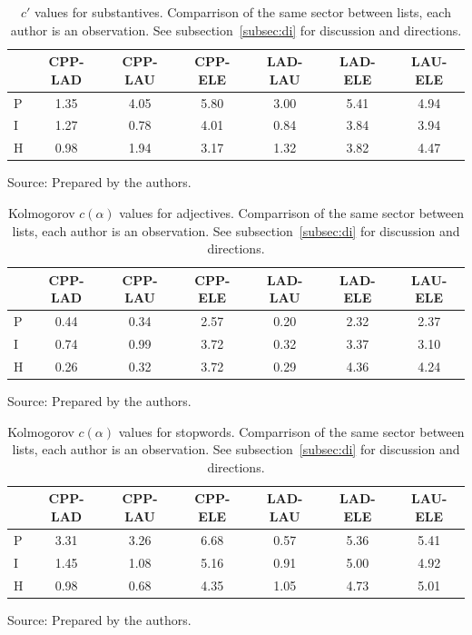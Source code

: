 \begin{table}
  \centering
  \caption{$c'$ values for substantives. Comparrison of the same sector between lists, each author is an observation. See subsection~\ref{subsec:di} for discussion and directions.}
    \small
\setlength{\tabcolsep}{.06667em}
  \begin{tabular}{|l|| c|c|c|c|c|c|}\hline
& CPP-LAD & CPP-LAU & CPP-ELE & LAD-LAU & LAD-ELE & LAU-ELE \\\hline
P & 1.35 & 4.05 & 5.80 & 3.00 & 5.41 & 4.94 \\\hline
I & 1.27 & 0.78 & 4.01 & 0.84 & 3.84 & 3.94 \\\hline
H & 0.98 & 1.94 & 3.17 & 1.32 & 3.82 & 4.47 \\\hline
  \end{tabular}
\begin{flushleft}
		Source: Prepared by the authors.\
\end{flushleft}
  \label{tab:kolSubInter}
\end{table}

\begin{table}
  \centering
  \caption{Kolmogorov $c(\alpha)$ values for adjectives. Comparrison of the same sector between lists, each author is an observation. See subsection~\ref{subsec:di} for discussion and directions.}
    \small
\setlength{\tabcolsep}{.06667em}
  \begin{tabular}{|l|| c|c|c|c|c|c|}\hline
 & CPP-LAD & CPP-LAU & CPP-ELE & LAD-LAU & LAD-ELE & LAU-ELE \\\hline
P & 0.44 & 0.34 & 2.57 & 0.20 & 2.32 & 2.37 \\\hline
I & 0.74 & 0.99 & 3.72 & 0.32 & 3.37 & 3.10 \\\hline
H & 0.26 & 0.32 & 3.72 & 0.29 & 4.36 & 4.24 \\\hline
  \end{tabular}
\begin{flushleft}
		Source: Prepared by the authors.\
\end{flushleft}
  \label{tab:kolAdjInter}
\end{table}

\begin{table}
  \centering
  \caption{Kolmogorov $c(\alpha)$ values for stopwords. Comparrison of the same sector between lists, each author is an observation. See subsection~\ref{subsec:di} for discussion and directions.}
    \small
\setlength{\tabcolsep}{.06667em}
  \begin{tabular}{|l|| c|c|c|c|c|c|}\hline
 & CPP-LAD & CPP-LAU & CPP-ELE & LAD-LAU & LAD-ELE & LAU-ELE \\\hline
P & 3.31 & 3.26 & 6.68 & 0.57 & 5.36 & 5.41 \\\hline
I & 1.45 & 1.08 & 5.16 & 0.91 & 5.00 & 4.92 \\\hline
H & 0.98 & 0.68 & 4.35 & 1.05 & 4.73 & 5.01 \\\hline
  \end{tabular}
\begin{flushleft}
		Source: Prepared by the authors.\
\end{flushleft}
  \label{tab:kolSwInter}
\end{table}

